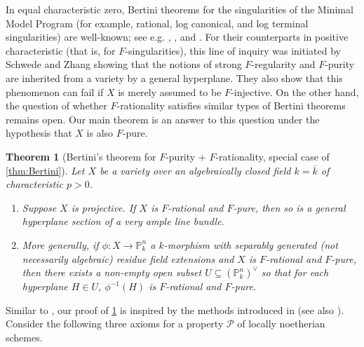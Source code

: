 \documentclass[reqno,11pt]{amsart}
\numberwithin{equation}{section}
\newtheorem{Theoremx}{Theorem}
\theoremstyle{definition}
\theoremstyle{definition}
\theoremstyle{definition}
\theoremstyle{remark}
\newcommand{\cP}{\mathcal{P}}
\begin{document}
In equal characteristic zero, Bertini theorems for the singularities of the Minimal Model Program (for example, rational, log canonical, and log terminal singularities) are well-known; see e.g. \cite[\S 4]{Kol97}, \cite[Chapter 5]{KM98}, and \cite[\S 9]{Laz04}. For their counterparts in positive characteristic (that is, for $F$-singularities), this line of inquiry was initiated by Schwede and Zhang \cite{SZ13} showing that the notions of strong $F$-regularity and $F$-purity are inherited from a variety by a general hyperplane. They also show that this phenomenon can fail if $X$ is merely assumed to be $F$-injective. On the other hand, the question of whether $F$-rationality satisfies similar types of Bertini theorems remains open. Our main theorem is an answer to this question under the hypothesis that $X$ is also $F$-pure.

\begin{Theoremx}[Bertini's theorem for $F$-purity + $F$-rationality, special case of \cref{thm:Bertini}]
    \label{thm: Bertini for F-rational singularities}
Let $X$ be a variety over an algebraically closed field $k=\overline{k}$ of characteristic $p>0$.
    \begin{enumerate}[label=(\roman*)]
        \item Suppose $X$ is projective. If $X$ is $F$-rational and $F$-pure, then so is a general hyperplane section of a very ample line bundle.
        \item More generally, if $\phi\colon X\to \mathbb{P}^n_k$ a $k$-morphism with separably generated (not necessarily algebraic) residue field extensions and $X$ is $F$-rational and $F$-pure, then there exists a non-empty open subset $U\subseteq (\mathbb{P}_k^n)^{\vee}$ so that for each hyperplane $H\in U$, $\phi^{-1}(H)$ is $F$-rational and $F$-pure.
    \end{enumerate} 
\end{Theoremx}


Similar to \cite{CRST21,DS22,SZ13}, our proof of \cref{thm: Bertini for F-rational singularities} is inspired by the methods introduced in \cite{CGM86} (see also \cite{Spr98}). Consider the following three axioms for a property $\cP$ of locally noetherian schemes. 
\end{document}
